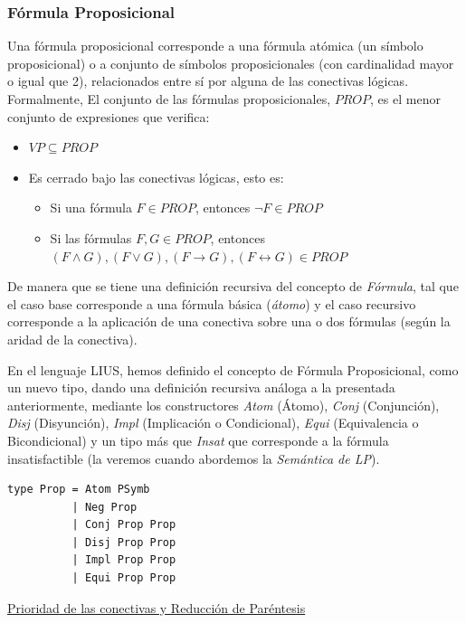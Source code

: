\documentclass[a4paper]{report}
\begin{document}
\subsubsection{Fórmula Proposicional}

Una fórmula proposicional corresponde a una fórmula atómica (un símbolo proposicional) o a conjunto de símbolos proposicionales (con cardinalidad mayor o igual que 2), relacionados entre sí por alguna de las conectivas lógicas. Formalmente, El conjunto de las fórmulas proposicionales, $PROP$, es el menor conjunto de expresiones que verifica:

\begin{itemize}
\item $VP \subseteq PROP$
\item Es cerrado bajo las conectivas lógicas, esto es:
\begin{itemize}
\item Si una fórmula $F \in PROP$, entonces  $\neg F \in PROP$
\item Si las fórmulas $F, G \in PROP$, entonces  $(F \wedge G), (F \vee G), (F \rightarrow G), (F \leftrightarrow G) \in PROP$
\end{itemize}
\end{itemize}

De manera que se tiene una definición recursiva del concepto de \textit{Fórmula}, tal que el caso base corresponde a una fórmula básica (\textit{átomo}) y el caso recursivo corresponde a la aplicación de una conectiva sobre una o dos fórmulas (según la aridad de la conectiva). 

En el lenguaje LIUS, hemos definido el concepto de Fórmula Proposicional, como un nuevo tipo, dando una definición recursiva análoga a la presentada anteriormente, mediante los constructores \textit{Atom} (Átomo), \textit{Conj} (Conjunción), \textit{Disj} (Disyunción), \textit{Impl} (Implicación o Condicional), \textit{Equi} (Equivalencia o Bicondicional) y un tipo más que \textit{Insat} que corresponde a la fórmula insatisfactible (la veremos cuando abordemos la \textit{Semántica de LP}).\\

\begin{lstlisting}[caption= Definición del tipo Prop (Fórmula Proposicional).]
type Prop = Atom PSymb
          | Neg Prop
          | Conj Prop Prop
          | Disj Prop Prop
          | Impl Prop Prop
          | Equi Prop Prop
\end{lstlisting}

\newpage
\noindent\underline{Prioridad de las conectivas y Reducción de Paréntesis}
\end{document}
